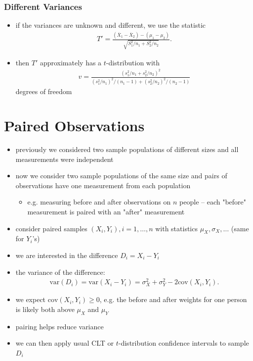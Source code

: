 \documentclass[10pt]{article}
\begin{document}
\subsubsection{Different Variances}
\begin{itemize}
    \item if the variances are unknown and different, we use the statistic 
        \begin{gather*}
            T' = \frac{(\overline{X}_1-\overline{X}_2) - (\mu_1 - \mu_2)}{\sqrt{S_1^2 / n_1 + S_2^2 / n_2}}
        .\end{gather*}
    \item then $T'$ approximately has a $t$-distribution with 
        \begin{gather*}
            v = \frac{(s_1^2 / n_1 + s_2^2 / n_2)^2}{(s_1^2 / n_1)^2 / (n_1 -1) + (s_2^2 / n_2)^2 / (n_2-1)}
        \end{gather*}
        degrees of freedom
\end{itemize}


\section{Paired Observations}
\begin{itemize}
    \item previously we considered two sample populations of different sizes and all measurements were independent
    \item now we consider two sample populations of the same size and pairs of observations have one measurement from each population
        \begin{itemize}
            \item e.g. measuring before and after observations on $n$ people -- each "before" measurement is paired with an "after" measurement
        \end{itemize}
    \item consider paired samples $(X_i, Y_i), i = 1, \ldots, n$ with statistics $\mu_X, \sigma_X, \ldots$ (same for $Y_i$'s)
    \item we are interested in the difference $D_i = X_i - Y_i$
    \item the variance of the difference: 
         \begin{gather*}
            \text{var}(D_i) = \text{var}(X_i - Y_i) = \sigma_X^2 + \sigma_Y^2 - 2 \text{cov}(X_i, Y_i)
        .\end{gather*}
    \item we expect $\text{cov}(X_i, Y_i) \ge 0$, e.g. the before and after weights for one person is likely both above $\mu_X$ and $\mu_Y$
    \item pairing helps reduce variance
    \item we can then apply usual CLT or $t$-distribution confidence intervals to sample $D_i$
\end{itemize}
\end{document}
